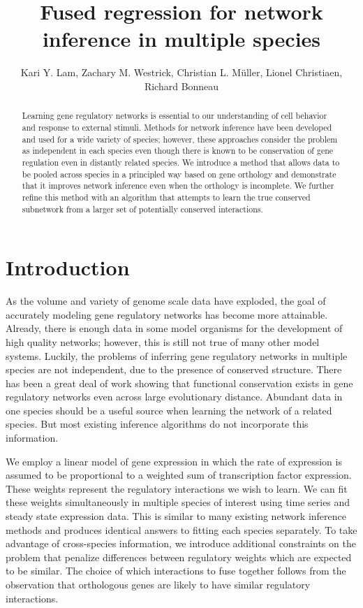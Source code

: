 \documentclass[11pt]{article}
\begin{document}
\title{Fused regression for network inference in multiple species}
\author{Kari Y. Lam, Zachary M. Westrick, Christian L. M\"{u}ller, Lionel Christiaen, Richard Bonneau}
\maketitle

\begin{abstract}
Learning gene regulatory networks is essential to our understanding of cell behavior and response to external stimuli. Methods for network inference have been developed and used for a wide variety of species; however, these approaches consider the problem as independent in each species even though there is known to be conservation of gene regulation even in distantly related species. We introduce a method that allows data to be pooled across species in a principled way based on gene orthology and demonstrate that it improves network inference even when the orthology is incomplete. We further refine this method with an algorithm that attempts to learn the true conserved subnetwork from a larger set of potentially conserved interactions. 
\end{abstract}

\section{Introduction}
As the volume and variety of genome scale data have exploded, the goal of accurately modeling gene regulatory networks has become more attainable. Already, there is enough data in some model organisms for the development of high quality networks; however, this is still not true of many other model systems. Luckily, the problems of inferring gene regulatory networks in multiple species are not independent, due to the presence of conserved structure. There has been a great deal of work showing that functional conservation exists in gene regulatory networks even across large evolutionary distance. Abundant data in one species should be a useful source when learning the network of a related species. But most existing inference algorithms do not incorporate this information.

We employ a linear model of gene expression in which the rate of expression is assumed to be proportional to a weighted sum of transcription factor expression. These weights represent the regulatory interactions we wish to learn. We can fit these weights simultaneously in multiple species of interest using time series and steady state expression data. This is similar to many existing network inference methods and produces identical answers to fitting each species separately. To take advantage of cross-species information, we introduce additional constraints on the problem that penalize differences between regulatory weights which are expected to be similar. The choice of which interactions to fuse together follows from the observation that orthologous genes are likely to have similar regulatory interactions.  
\end{document}
